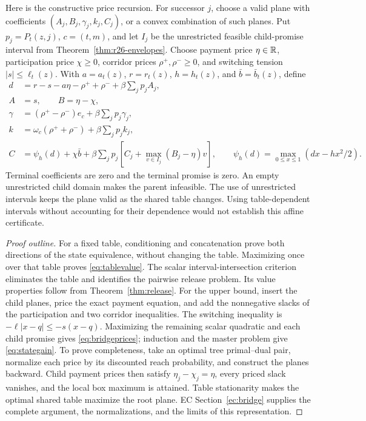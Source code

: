 Here is the constructive price recursion. For successor $j$, choose a valid plane with coefficients $(A_j,B_j,\gamma_j,k_j,C_j)$, or a convex combination of such planes. Put $p_j=P_t(z,j)$, $c=(t,m)$, and let $I_j$ be the unrestricted feasible child-promise interval from Theorem~\ref{thm:r26-envelopes}. Choose payment price $\eta\in\mathbb R$, participation price $\chi\geq0$, corridor prices $\rho^+,\rho^-\geq0$, and switching tension $|s|\leq\ell_t(z)$. With $a=a_t(z)$, $r=r_t(z)$, $h=h_t(z)$, and $\bar b=\bar b_t(z)$, define
\begin{equation}\label{eq:bridgeprices}
\begin{split}
 d&=r-s-a\eta-\rho^++\rho^-+\beta\sum_jp_jA_j,\\
 A&=s,\qquad B=\eta-\chi,\\
 \gamma&=(\rho^+-\rho^-)e_c+\beta\sum_jp_j\gamma_j,\\
 k&=\omega_c(\rho^++\rho^-)+\beta\sum_jp_j k_j,\\
 C&=\psi_h(d)+\chi\bar b+
 \beta\sum_jp_j\left[C_j+\max_{v\in I_j}(B_j-\eta)v\right],
 \qquad \psi_h(d)=\max_{0\leq x\leq1}(dx-hx^2/2).
\end{split}
\end{equation}
Terminal coefficients are zero and the terminal promise is zero. An empty unrestricted child domain makes the parent infeasible. The use of unrestricted intervals keeps the plane valid as the shared table changes. Using table-dependent intervals without accounting for their dependence would not establish this affine certificate.

\begin{proof}[Proof outline]
For a fixed table, conditioning and concatenation prove both directions of the state equivalence, without changing the table. Maximizing once over that table proves \eqref{eq:tablevalue}. The scalar interval-intersection criterion eliminates the table and identifies the pairwise release problem. Its value properties follow from Theorem~\ref{thm:release}.
For the upper bound, insert the child planes, price the exact payment equation, and add the nonnegative slacks of the participation and two corridor inequalities. The switching inequality is $-\ell|x-q|\leq-s(x-q)$. Maximizing the remaining scalar quadratic and each child promise gives \eqref{eq:bridgeprices}; induction and the master problem give \eqref{eq:stategain}. To prove completeness, take an optimal tree primal--dual pair, normalize each price by its discounted reach probability, and construct the planes backward. Child payment prices then satisfy $\eta_j-\chi_j=\eta$, every priced slack vanishes, and the local box maximum is attained. Table stationarity makes the optimal shared table maximize the root plane. EC Section~\ref{ec:bridge} supplies the complete argument, the normalizations, and the limits of this representation.
\end{proof}

